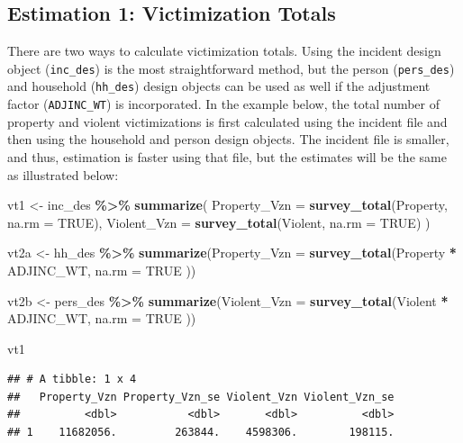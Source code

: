 \documentclass[
]{krantz}
\makeatletter
\newenvironment{Shaded}{\begin{snugshade}}{\end{snugshade}}
\newcommand{\AttributeTok}[1]{\textcolor[rgb]{0.27,0.27,0.27}{#1}}
\newcommand{\ConstantTok}[1]{\textcolor[rgb]{0.37,0.37,0.37}{#1}}
\newcommand{\FunctionTok}[1]{\textcolor[rgb]{0.27,0.27,0.27}{\textbf{#1}}}
\newcommand{\NormalTok}[1]{#1}
\newcommand{\OtherTok}[1]{\textcolor[rgb]{0.37,0.37,0.37}{#1}}
\newcommand{\SpecialCharTok}[1]{\textcolor[rgb]{0.43,0.43,0.43}{\textbf{#1}}}
\newenvironment{kframe}{%
\medskip{}
\setlength{\fboxsep}{.8em}
 \def\at@end@of@kframe{}%
 \ifinner\ifhmode%
  \def\at@end@of@kframe{\end{minipage}}%
  \begin{minipage}{\columnwidth}%
 \fi\fi%
 \def\FrameCommand##1{\hskip\@totalleftmargin \hskip-\fboxsep
 \colorbox{shadecolor}{##1}\hskip-\fboxsep
     \hskip-\linewidth \hskip-\@totalleftmargin \hskip\columnwidth}%
 \MakeFramed {\advance\hsize-\width
   \@totalleftmargin\z@ \linewidth\hsize
   \@setminipage}}%
 {\par\unskip\endMakeFramed%
 \at@end@of@kframe}
\renewenvironment{Shaded}{\begin{kframe}}{\end{kframe}}
\makeatother
\begin{document}
\hypertarget{vic-tot}{%
\subsection{Estimation 1: Victimization Totals}\label{vic-tot}}

There are two ways to calculate victimization totals. Using the incident design object (\texttt{inc\_des}) is the most straightforward method, but the person (\texttt{pers\_des}) and household (\texttt{hh\_des}) design objects can be used as well if the adjustment factor (\texttt{ADJINC\_WT}) is incorporated. In the example below, the total number of property and violent victimizations is first calculated using the incident file and then using the household and person design objects. The incident file is smaller, and thus, estimation is faster using that file, but the estimates will be the same as illustrated below:

\begin{Shaded}
\begin{Highlighting}[]
\NormalTok{vt1 }\OtherTok{\textless{}{-}}\NormalTok{ inc\_des }\SpecialCharTok{\%\textgreater{}\%}
  \FunctionTok{summarize}\NormalTok{(}
    \AttributeTok{Property\_Vzn =} \FunctionTok{survey\_total}\NormalTok{(Property, }\AttributeTok{na.rm =} \ConstantTok{TRUE}\NormalTok{),}
    \AttributeTok{Violent\_Vzn =} \FunctionTok{survey\_total}\NormalTok{(Violent, }\AttributeTok{na.rm =} \ConstantTok{TRUE}\NormalTok{)}
\NormalTok{  )}

\NormalTok{vt2a }\OtherTok{\textless{}{-}}\NormalTok{ hh\_des }\SpecialCharTok{\%\textgreater{}\%}
  \FunctionTok{summarize}\NormalTok{(}\AttributeTok{Property\_Vzn =} \FunctionTok{survey\_total}\NormalTok{(Property }\SpecialCharTok{*}\NormalTok{ ADJINC\_WT,}
    \AttributeTok{na.rm =} \ConstantTok{TRUE}
\NormalTok{  ))}

\NormalTok{vt2b }\OtherTok{\textless{}{-}}\NormalTok{ pers\_des }\SpecialCharTok{\%\textgreater{}\%}
  \FunctionTok{summarize}\NormalTok{(}\AttributeTok{Violent\_Vzn =} \FunctionTok{survey\_total}\NormalTok{(Violent }\SpecialCharTok{*}\NormalTok{ ADJINC\_WT,}
    \AttributeTok{na.rm =} \ConstantTok{TRUE}
\NormalTok{  ))}

\NormalTok{vt1}
\end{Highlighting}
\end{Shaded}

\begin{verbatim}
## # A tibble: 1 x 4
##   Property_Vzn Property_Vzn_se Violent_Vzn Violent_Vzn_se
##          <dbl>           <dbl>       <dbl>          <dbl>
## 1    11682056.         263844.    4598306.        198115.
\end{verbatim}
\end{document}

